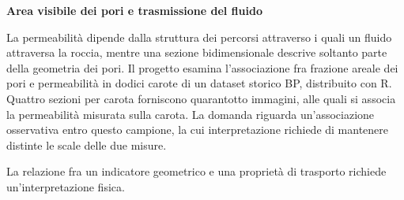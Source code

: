 \documentclass[12pt,aspectratio=1610]{beamer}
\begin{document}
\begin{frame}[plain]
\end{frame}
\begin{lrbox}{\TitleBox}\begin{minipage}[t]{18.2cm}\raggedright\sloppy\color{Ink}\fontsize{20.7}{24}\selectfont \bfseries\color{Navy}Area visibile dei pori e trasmissione del fluido\end{minipage}\end{lrbox}
\begin{lrbox}{\BodyBox}\begin{minipage}[t]{10.25cm}\raggedright\sloppy\color{Ink}\fontsize{12.4}{16.4}\selectfont La permeabilità dipende dalla struttura dei percorsi attraverso i quali un fluido attraversa la roccia, mentre una sezione bidimensionale descrive soltanto parte della geometria dei pori. Il progetto esamina l’associazione fra frazione areale dei pori e permeabilità in dodici carote di un dataset storico BP, distribuito con R. Quattro sezioni per carota forniscono quarantotto immagini, alle quali si associa la permeabilità misurata sulla carota. La domanda riguarda un’associazione osservativa entro questo campione, la cui interpretazione richiede di mantenere distinte le scale delle due misure.\end{minipage}\end{lrbox}
\begin{lrbox}{\SideBox}\begin{minipage}[t]{7.45cm}\raggedright\sloppy\color{Ink}\fontsize{12.2}{16.1}\selectfont \end{minipage}\end{lrbox}
\begin{lrbox}{\RecallBox}\begin{minipage}[t]{16.45cm}\raggedright\sloppy\color{Ink}\fontsize{10.1}{13.2}\selectfont La relazione fra un indicatore geometrico e una proprietà di trasporto richiede un’interpretazione fisica.\end{minipage}\end{lrbox}
\end{document}
